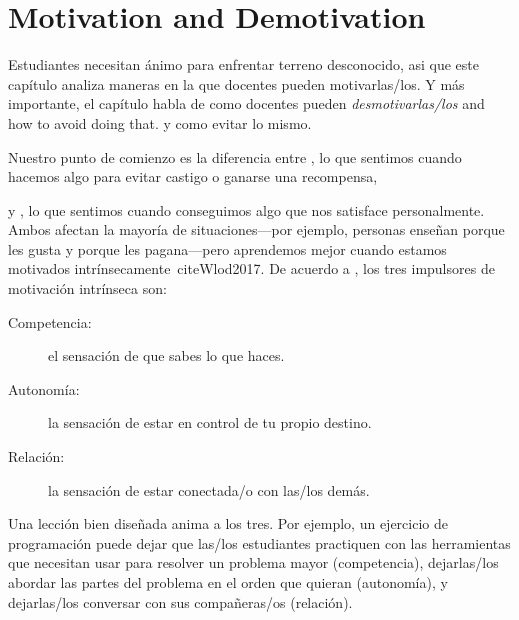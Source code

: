 \chapter{Motivation and Demotivation}\label{s:motivation}

Estudiantes necesitan ánimo para enfrentar terreno desconocido,
asi que este capítulo analiza maneras en la que docentes pueden motivarlas/los.
Y más importante,
el capítulo habla de como docentes pueden \emph{desmotivarlas/los}
and how to avoid doing that.
y como evitar lo mismo.

Nuestro punto de comienzo es la diferencia entre
,
lo que sentimos cuando hacemos algo para evitar castigo o ganarse una recompensa,

y ,
lo que sentimos cuando conseguimos algo que nos satisface personalmente.
Ambos afectan la mayoría de situaciones---por ejemplo,
personas enseñan porque les gusta y porque les pagana---pero
aprendemos mejor cuando estamos motivados intrínsecamente~cite{Wlod2017}.
De acuerdo a 
,
los tres impulsores de motivación intrínseca son:

\begin{description}

\item[Competencia:]
  el sensación de que sabes lo que haces. 

\item[Autonomía:]
  la sensación de estar en control de tu propio destino.

\item[Relación:]
  la sensación de estar conectada/o con las/los demás.

\end{description}

Una lección bien diseñada anima a los tres.
Por ejemplo,
un ejercicio de programación puede
dejar que las/los estudiantes practiquen con las herramientas que necesitan usar para resolver un problema mayor (competencia),
dejarlas/los abordar las partes del problema en el orden que quieran (autonomía),
y dejarlas/los conversar con sus compañeras/os (relación).


